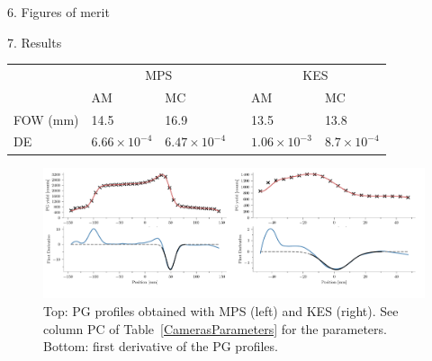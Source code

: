 \documentclass[final]{beamer} %
\begin{document}
\begin{frame}{}
\begin{columns}[t]
\begin{column}{0.49\textwidth}
\begin{block}{6. Figures of merit\label{FOM}}
	  \end{block}				
		

       
		
		\begin{block}{7. Results}
			{}
			\begin{table}[h]
			\centering
			\begin{tabular}{llllll}
				\midrule
							& \multicolumn{2}{c}{MPS}												&& \multicolumn{2}{c}{KES}										\\
				\cline{2-3}\cline{5-6}
							& AM 											& MC 									&& AM 										& MC								\\
				\midrule

				FOW (mm)& 14.5 								& 16.9  	 					&& 13.5 								& 13.8 						\\
				DE		& $6.66 \times 10^{-4}$  & $6.47 \times 10^{-4}$	&&	$1.06 \times 10^{-3}$   & $8.7 \times 10^{-4}$\\
				\midrule
			\end{tabular}
			\end{table}			
			{}
% 
% 				
% 

			
				\begin{figure}
					\includegraphics[width=\textwidth]{./figures/output-crop}			
					\caption{Top: PG profiles obtained with MPS (left) and KES (right). See column PC of Table~\ref{CamerasParameters} for the parameters. Bottom: first derivative of the PG profiles.}
					\label{PGprofiles}
				\end{figure}					
				

\end{block}
\end{column}
\end{columns}
\end{frame}
\end{document}
